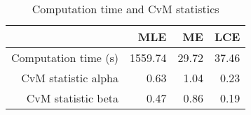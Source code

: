 \begin{table}[ht]
\centering
\begin{tabular}{rrrr}
  \hline
 & MLE & ME & LCE \\ 
  \hline
Computation time (s) & 1559.74 & 29.72 & 37.46 \\ 
  CvM statistic alpha & 0.63 & 1.04 & 0.23 \\ 
  CvM statistic beta & 0.47 & 0.86 & 0.19 \\ 
   \hline
\end{tabular}
\caption{Computation time and CvM statistics} 
\label{tab:gamma:time:cvm}
\end{table}
